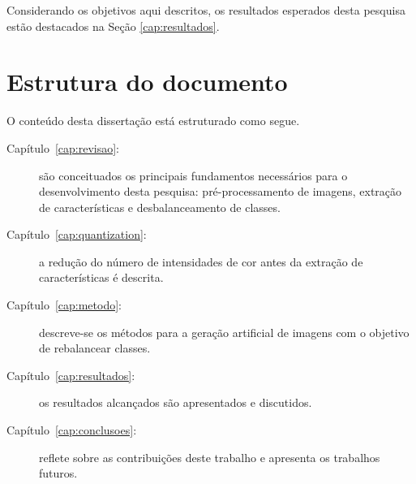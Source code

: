 Considerando os objetivos aqui descritos, os resultados esperados desta pesquisa estão destacados na Seção \ref{cap:resultados}.

\section{Estrutura do documento}

O conteúdo desta dissertação está estruturado como segue.

\begin{description}
\item [Capítulo~\ref{cap:revisao}:] são conceituados os principais fundamentos necessários para o desenvolvimento desta pesquisa: pré-processamento de imagens, extração de características e desbalanceamento de classes.

\item [Capítulo~\ref{cap:quantization}:] a redução do número de intensidades de cor antes da extração de características é descrita.

\item [Capítulo~\ref{cap:metodo}:] descreve-se os métodos para a geração artificial de imagens com o objetivo de rebalancear classes.

\item [Capítulo~\ref{cap:resultados}:] os resultados alcançados são apresentados e discutidos.

\item [Capítulo~\ref{cap:conclusoes}:] reflete sobre as contribuições deste trabalho e apresenta os trabalhos futuros.

\end{description}
